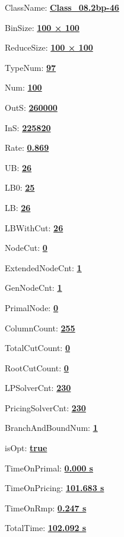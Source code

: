 \documentclass[11pt]{article}
\begin{document}
\pagestyle{empty}


ClassName: \underline{\textbf{Class_08.2bp-46}}
\par
BinSize: \underline{\textbf{100 × 100}}
\par
ReduceSize: \underline{\textbf{100 × 100}}
\par
TypeNum: \underline{\textbf{97}}
\par
Num: \underline{\textbf{100}}
\par
OutS: \underline{\textbf{260000}}
\par
InS: \underline{\textbf{225820}}
\par
Rate: \underline{\textbf{0.869}}
\par
UB: \underline{\textbf{26}}
\par
LB0: \underline{\textbf{25}}
\par
LB: \underline{\textbf{26}}
\par
LBWithCut: \underline{\textbf{26}}
\par
NodeCut: \underline{\textbf{0}}
\par
ExtendedNodeCnt: \underline{\textbf{1}}
\par
GenNodeCnt: \underline{\textbf{1}}
\par
PrimalNode: \underline{\textbf{0}}
\par
ColumnCount: \underline{\textbf{255}}
\par
TotalCutCount: \underline{\textbf{0}}
\par
RootCutCount: \underline{\textbf{0}}
\par
LPSolverCnt: \underline{\textbf{230}}
\par
PricingSolverCnt: \underline{\textbf{230}}
\par
BranchAndBoundNum: \underline{\textbf{1}}
\par
isOpt: \underline{\textbf{true}}
\par
TimeOnPrimal: \underline{\textbf{0.000 s}}
\par
TimeOnPricing: \underline{\textbf{101.683 s}}
\par
TimeOnRmp: \underline{\textbf{0.247 s}}
\par
TotalTime: \underline{\textbf{102.092 s}}
\par
\newpage


\end{document}
